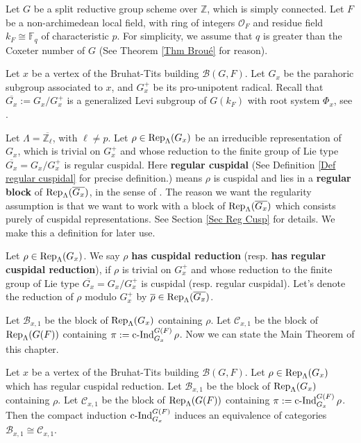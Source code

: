 	Let $G$ be a split reductive group scheme over $\mathbb{Z}$, which is simply connected. Let $F$ be a non-archimedean local field, with ring of integers $\mathcal{O}_F$ and residue field $k_F \cong \mathbb{F}_q$ of characteristic $p$. For simplicity, we assume that $q$ is greater than the Coxeter number of $G$ (See Theorem \ref{Thm Broué} for reason).
	
	Let $x$ be a vertex of the Bruhat-Tits building $\mathcal{B}(G, F)$. Let $G_x$ be the parahoric subgroup associated to $x$, and $G_x^+$ be its pro-unipotent radical. Recall that $\overline{G_x}:=G_x/G_x^+$ is a generalized Levi subgroup of $G(k_F)$ with root system $\Phi_x$, see \cite[Theorem 3.17]{rabinoff2003bruhat}. 
	
	Let $\Lambda=\overline{\mathbb{Z}_\ell}$, with $\ell \neq p$. Let $\rho \in \operatorname{\operatorname{Rep}}_{\Lambda}(G_x)$ be an irreducible representation of $G_x$, which is trivial on $G_x^+$ and whose reduction to the finite group of Lie type $\overline{G_x}=G_x/G_x^+$ is  
	regular cuspidal. Here \textbf{regular cuspidal} (See Definition \ref{Def regular cuspidal} for precise definition.) means $\rho$ is cuspidal and lies in a \textbf{regular block} of $\operatorname{\operatorname{Rep}}_{\Lambda}(\overline{G_x})$, in the sense of \cite{broue1990isometries}. The reason we want the regularity assumption is that we want to work with a block of $\operatorname{\operatorname{Rep}}_{\Lambda}(\overline{G_x})$ which consists purely of cuspidal representations. See Section \ref{Sec Reg Cusp} for details. We make this a definition for later use.
	
	\begin{definition}
		Let $\rho \in \operatorname{\operatorname{Rep}}_{\Lambda}(G_x)$. We say $\rho$ \textbf{has cuspidal reduction} (resp. \textbf{has regular cuspidal reduction}), if $\rho$ is trivial on $G_x^+$ and whose reduction to the finite group of Lie type $\overline{G_x}=G_x/G_x^+$ is cuspidal (resp. regular cuspidal). Let's denote the reduction of $\rho$ modulo $G_x^+$ by $\overline{\rho} \in \operatorname{\operatorname{Rep}}_{\Lambda}(\overline{G_x})$.
	\end{definition}
	
	Let $\mathcal{B}_{x,1}$ be the block of $\operatorname{\operatorname{Rep}}_{\Lambda}(G_x)$ containing $\rho$. Let $\mathcal{C}_{x,1}$ be the block of $\operatorname{\operatorname{Rep}}_{\Lambda}(G(F))$ containing $\pi:=\operatorname{\operatorname{c-Ind}}_{G_x}^{G(F)}\rho$. Now we can state the Main Theorem of this chapter.
	
	\begin{theorem}\label{Thm Main}
		Let $x$ be a vertex of the Bruhat-Tits building $\mathcal{B}(G, F)$. Let $\rho \in \operatorname{\operatorname{Rep}}_{\Lambda}(G_x)$ which has regular cuspidal reduction. Let $\mathcal{B}_{x,1}$ be the block of $\operatorname{\operatorname{Rep}}_{\Lambda}(G_x)$ containing $\rho$. Let $\mathcal{C}_{x,1}$ be the block of $\operatorname{\operatorname{Rep}}_{\Lambda}(G(F))$ containing $\pi:=\operatorname{\operatorname{c-Ind}}_{G_x}^{G(F)}\rho$. Then the compact induction $\operatorname{\operatorname{c-Ind}}_{G_x}^{G(F)}$ induces an equivalence of categories $\mathcal{B}_{x,1} \cong \mathcal{C}_{x,1}$. 
	\end{theorem}
	
